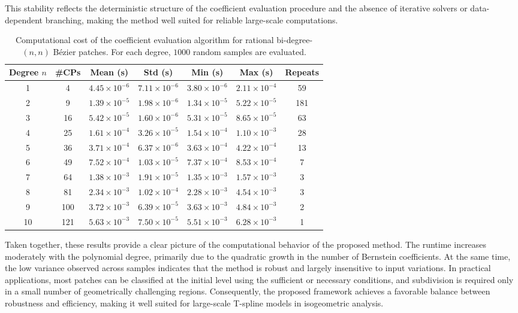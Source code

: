 \documentclass{jssc}
\begin{document}
This stability reflects the deterministic structure of the coefficient evaluation procedure and the absence of iterative solvers or data-dependent branching, making the method well suited for reliable large-scale computations.

\begin{table}
\centering
\caption{Computational cost of the coefficient evaluation algorithm for rational bi-degree-$(n,n)$ B\'ezier patches. For each degree, $1000$ random samples are evaluated.}
\label{tab:efficiency}
\begin{tabular}{c c c c c c c}
\hline
Degree $n$ & \#CPs & Mean (s) & Std (s) & Min (s) & Max (s) & Repeats \\
\hline
1  & 4   & $4.45\times10^{-6}$ & $7.11\times10^{-6}$ & $3.80\times10^{-6}$ & $2.11\times10^{-4}$ & 59 \\
2  & 9   & $1.39\times10^{-5}$ & $1.98\times10^{-6}$ & $1.34\times10^{-5}$ & $5.22\times10^{-5}$ & 181 \\
3  & 16  & $5.42\times10^{-5}$ & $1.60\times10^{-6}$ & $5.31\times10^{-5}$ & $8.65\times10^{-5}$ & 63 \\
4  & 25  & $1.61\times10^{-4}$ & $3.26\times10^{-5}$ & $1.54\times10^{-4}$ & $1.10\times10^{-3}$ & 28 \\
5  & 36  & $3.71\times10^{-4}$ & $6.37\times10^{-6}$ & $3.63\times10^{-4}$ & $4.22\times10^{-4}$ & 13 \\
6  & 49  & $7.52\times10^{-4}$ & $1.03\times10^{-5}$ & $7.37\times10^{-4}$ & $8.53\times10^{-4}$ & 7 \\
7  & 64  & $1.38\times10^{-3}$ & $1.91\times10^{-5}$ & $1.35\times10^{-3}$ & $1.57\times10^{-3}$ & 3 \\
8  & 81  & $2.34\times10^{-3}$ & $1.02\times10^{-4}$ & $2.28\times10^{-3}$ & $4.54\times10^{-3}$ & 3 \\
9  & 100 & $3.72\times10^{-3}$ & $6.39\times10^{-5}$ & $3.63\times10^{-3}$ & $4.84\times10^{-3}$ & 2 \\
10 & 121 & $5.63\times10^{-3}$ & $7.50\times10^{-5}$ & $5.51\times10^{-3}$ & $6.28\times10^{-3}$ & 1 \\
\hline
\end{tabular}
\end{table}

Taken together, these results provide a clear picture of the computational behavior of the proposed method. The runtime increases moderately with the polynomial degree, primarily due to the quadratic growth in the number of Bernstein coefficients. At the same time, the low variance observed across samples indicates that the method is robust and largely insensitive to input variations. In practical applications, most patches can be classified at the initial level using the sufficient or necessary conditions, and subdivision is required only in a small number of geometrically challenging regions. Consequently, the proposed framework achieves a favorable balance between robustness and efficiency, making it well suited for large-scale T-spline models in isogeometric analysis.
\end{document}

